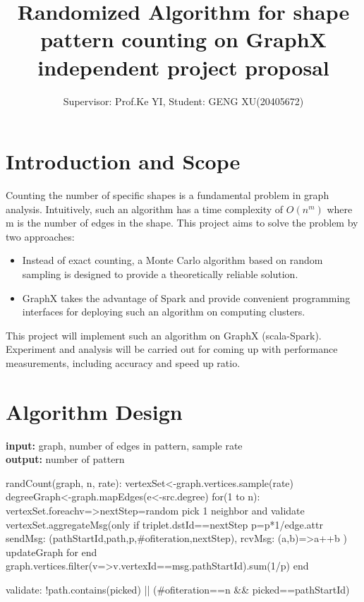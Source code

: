 \documentclass[11pt]{article}
\title{%
  Randomized Algorithm for shape pattern counting on GraphX \\
  \large independent project proposal}
\author{Supervisor: Prof.Ke YI, Student: GENG XU(20405672)}
\begin{document}
\maketitle

\vspace*{-0.8cm}

\section*{Introduction and Scope}

\item Counting the number of specific shapes is a fundamental problem in graph analysis. Intuitively, such an algorithm has a time complexity of $O(n^{m})$ where m is the number of edges in the shape. This project aims to solve the problem by two approaches:

\begin{itemize}
\item Instead of exact counting, a Monte Carlo algorithm based on random sampling is designed to provide a theoretically reliable solution.
\item GraphX takes the advantage of Spark and provide convenient programming interfaces for deploying such an algorithm on computing clusters.
\end{itemize}
\item This project will implement such an algorithm on GraphX (scala-Spark). Experiment and analysis will be carried out for coming up with performance measurements, including accuracy and speed up ratio.

\section*{Algorithm Design}
\textbf{input:} graph, number of edges in pattern, sample rate \\
\textbf{output:} number of pattern 

\begin{PseudoCode}
randCount(graph, n, rate):
	vertexSet<-graph.vertices.sample(rate)
	degreeGraph<-graph.mapEdges(e<-src.degree)
	for(1 to n):
		vertexSet.foreach{v=>nextStep=random pick 1 neighbor and validate}
		vertexSet.aggregateMsg(only if triplet.dstId==nextStep			
			p=p*1/edge.attr
			sendMsg: (pathStartId,path,p,#ofiteration,nextStep),
			rcvMsg: (a,b)=>a++b
		)
		updateGraph
	for end
	graph.vertices.filter(v=>v.vertexId==msg.pathStartId).sum(1/p)
end

validate:
	!path.contains(picked) || (#ofiteration==n && picked==pathStartId)
	
\end{PseudoCode}
\end{document}
